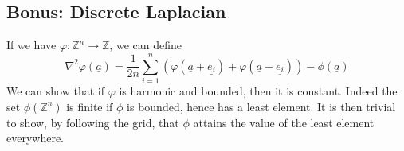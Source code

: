 \subsection{Bonus: Discrete Laplacian}
If we have $\varphi:\mathbb Z^n\to\mathbb Z$, we can define
$$\nabla^2\varphi(\underline{a})=\frac{1}{2n}\sum_{i=1}^n(\varphi(\underline{a}+\underline{e_i})+\varphi(\underline{a}-\underline{e_i}))-\phi(\underline{a})$$
We can show that if $\varphi$ is harmonic and bounded, then it is constant.
Indeed the set $\phi(\mathbb Z^n)$ is finite if $\phi$ is bounded, hence has a least element.
It is then trivial to show, by following the grid, that $\phi$ attains the value of the least element everywhere.